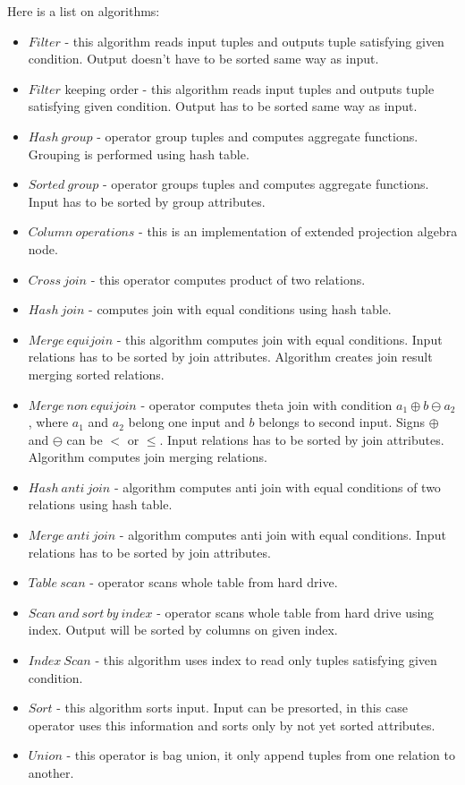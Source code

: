 Here is a list on algorithms:
\begin{itemize}
\item $Filter$ - this algorithm reads input tuples and outputs tuple satisfying given condition. Output doesn't have to be sorted same way as input.
\item $Filter$ keeping order - this algorithm reads input tuples and outputs tuple satisfying given condition. Output has to be sorted same way as input.
\item $Hash~group$ - operator group tuples and computes aggregate functions. Grouping is performed using hash table.
\item $Sorted~group$ - operator groups tuples and computes aggregate functions. Input has to be sorted by group attributes.
\item $Column~operations$ - this is an implementation of extended projection algebra node. 
\item $Cross~join$ - this operator computes product of two relations.
\item $Hash~join$ - computes join with equal conditions using hash table. 
\item $Merge~equijoin$ - this algorithm computes join with equal conditions. Input relations has to be sorted by join attributes. Algorithm creates join result merging sorted relations.
\item $Merge~non~equijoin$ - operator computes theta join with condition $a_1\oplus b \ominus a_2$, where $a_1$ and $a_2$ belong one input and $b$ belongs to second input. Signs $\oplus$ and $\ominus$ can be $<$ or $\leq$. Input relations has to be sorted by join attributes. Algorithm computes join merging relations.
\item $Hash~anti~join$ -  algorithm computes anti join with equal conditions of two relations using hash table.
\item $Merge~anti~join$ - algorithm computes anti join with equal conditions. Input relations has to be sorted by join attributes.
\item $Table~scan$ - operator scans whole table from hard drive.
\item $Scan~and~sort~by~index$ - operator scans whole table from hard drive using index. Output will be sorted by columns on given index.
\item $Index~Scan$ - this algorithm uses index to read only tuples satisfying given condition.
\item $Sort$ - this algorithm sorts input. Input can be presorted, in this case operator uses this information and sorts only by not yet sorted attributes.
\item $Union$ - this operator is bag union, it only append tuples from one relation to another.

\end{itemize}


